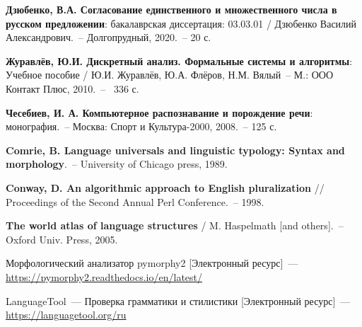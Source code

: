 \documentclass[oneside, final, 12pt]{article}
\theoremstyle{plain}
\theoremstyle{plain} %
\begin{document}

\begin{thebibliography}{500}
	

\textbf{ Дзюбенко, В.А. Согласование единственного и множественного числа в русском предложении}: бакалаврская диссертация: 03.03.01 / Дзюбенко Василий Александрович.~-- Долгопрудный, 2020.~-- 20 с.

\textbf{ Журавлёв, Ю.И. Дискретный анализ. Формальные системы и алгоритмы}: Учебное пособие / Ю.И. Журавлёв, Ю.А. Флёров, Н.М. Вялый~-- М.: ООО Контакт Плюс, 2010.~--~ 336 с.


 \textbf{Чесебиев, И. А. Компьютерное распознавание и порождение речи}: монография.~-- Москва: Спорт и Культура-2000, 2008.~-- 125 с.

 \textbf{Comrie, B. Language universals and linguistic typology: Syntax and morphology}.~-- University of Chicago press, 1989.

 \textbf{Conway, D. An algorithmic approach to English pluralization} // Proceedings of the Second Annual Perl Conference.~-- 1998.

 \textbf{The world atlas of language structures} / M. Haspelmath [and others].~-- Oxford Univ. Press, 2005.

 Морфологический анализатор pymorphy2 [Электронный ресурс]~--- \href{https://pymorphy2.readthedocs.io/en/latest/}{https://pymorphy2.readthedocs.io/en/latest/}

 LanguageTool~--- Проверка грамматики и стилистики [Электронный ресурс]~--- \href{https://languagetool.org/ru}{https://languagetool.org/ru}


\end{thebibliography}
\pagebreak

\appendix


\pagebreak

\end{document}
